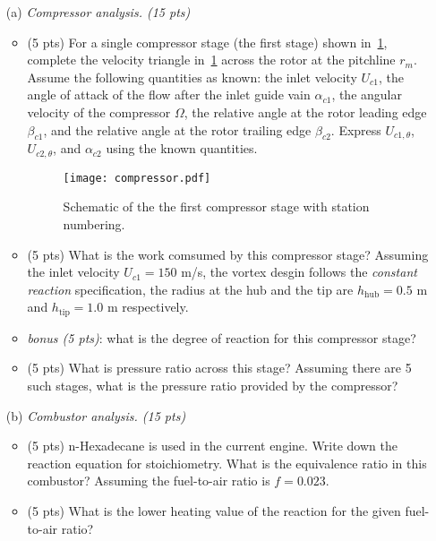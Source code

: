 \documentclass[11pt]{article}
\begin{document}
\begin{itemize}
	\item[(a)] \emph{Compressor analysis. (15 pts)} 
	\begin{itemize}
		\item (5 pts) For a single compressor stage (the first stage) shown in~\cref{fig:compressor}, complete the velocity triangle in~\cref{fig:compressor} across the rotor at the pitchline $r_m$. Assume the following quantities as known: the inlet velocity $U_{c1}$, the angle of attack of the flow after the inlet guide vain $\alpha_{c1}$, the angular velocity of the compressor $\Omega$, the relative angle at the rotor leading edge $\beta_{c1}$, and the relative angle at the rotor trailing edge $\beta_{c2}$. Express $U_{c1,\theta}$, $U_{c2,\theta}$, and $\alpha_{c2}$ using the known quantities.
		
		\begin{figure}[ht]
			\centering
			\texttt{[image: compressor.pdf]}
		    \caption{Schematic of the the first compressor stage with station numbering.}
			\label{fig:compressor}
		\end{figure}
		
		\item (5 pts) What is the work comsumed by this compressor stage? Assuming the inlet velocity $U_{c1} = 150$ m/s, the vortex desgin follows the \emph{constant reaction} specification, the radius at the hub and the tip are $h_\text{hub} = 0.5$ m and $h_\text{tip} = 1.0$ m respectively.
		
		\item \emph{bonus (5 pts)}: what is the degree of reaction for this compressor stage?
		
		\item (5 pts) What is pressure ratio across this stage? Assuming there are 5 such stages, what is the pressure ratio provided by the compressor?
		
	\end{itemize}
	
	\item[(b)] \emph{Combustor analysis. (15 pts)}
	\begin{itemize}
		\item (5 pts) n-Hexadecane is used in the current engine. Write down the reaction equation for stoichiometry. What is the equivalence ratio in this combustor? Assuming the fuel-to-air ratio is $f=0.023$.
		
		\item (5 pts) What is the lower heating value of the reaction for the given fuel-to-air ratio?
		

\end{itemize}
\end{itemize}
\end{document}
